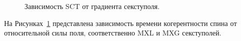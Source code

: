\begin{figure}[h]\centering
	\caption{Зависимость SCT от градиента секступоля.\label{fig:SCT_scan}}
\end{figure}

На Рисунках~\ref{fig:SCT_scan} представлена зависимость времени когерентности спина от относительной силы поля, соответственно MXL и MXG секступолей.